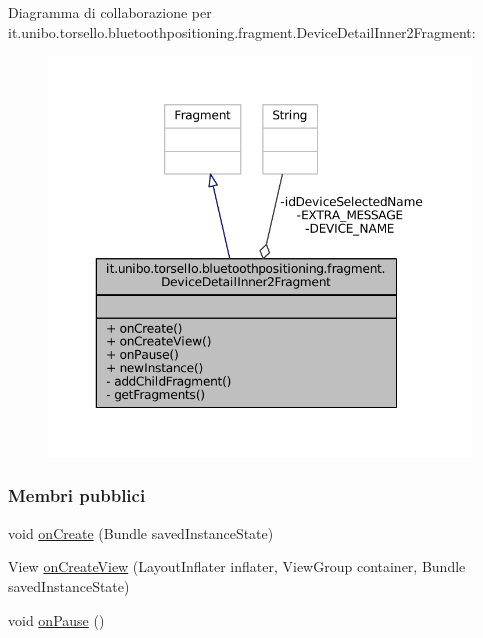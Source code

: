 Diagramma di collaborazione per it.\+unibo.\+torsello.\+bluetoothpositioning.\+fragment.\+Device\+Detail\+Inner2\+Fragment\+:
\nopagebreak
\begin{figure}[H]
\begin{center}
\leavevmode
\includegraphics[width=350pt]{classit_1_1unibo_1_1torsello_1_1bluetoothpositioning_1_1fragment_1_1DeviceDetailInner2Fragment__coll__graph}
\end{center}
\end{figure}
\subsubsection*{Membri pubblici}
\begin{DoxyCompactItemize}
\item 
void \hyperlink{classit_1_1unibo_1_1torsello_1_1bluetoothpositioning_1_1fragment_1_1DeviceDetailInner2Fragment_a0f0b6b90d40bb3f44a66de91da787f75_a0f0b6b90d40bb3f44a66de91da787f75}{on\+Create} (Bundle saved\+Instance\+State)
\item 
View \hyperlink{classit_1_1unibo_1_1torsello_1_1bluetoothpositioning_1_1fragment_1_1DeviceDetailInner2Fragment_aaaab1478726f0d8a4b9bdfe3eab122c8_aaaab1478726f0d8a4b9bdfe3eab122c8}{on\+Create\+View} (Layout\+Inflater inflater, View\+Group container, Bundle saved\+Instance\+State)
\item 
void \hyperlink{classit_1_1unibo_1_1torsello_1_1bluetoothpositioning_1_1fragment_1_1DeviceDetailInner2Fragment_ab201a51f09d4ccd17f91d5952b9ed788_ab201a51f09d4ccd17f91d5952b9ed788}{on\+Pause} ()
\end{DoxyCompactItemize}
